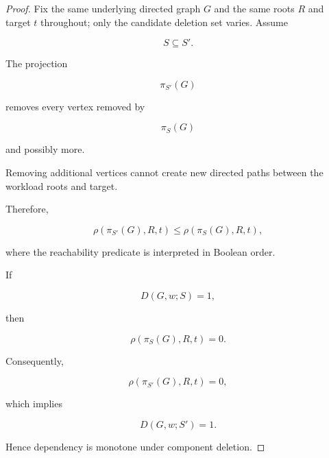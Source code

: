 \documentclass[11pt]{article}
\begin{document}
\begin{proof}

Fix the same underlying directed graph $G$ and the same roots $R$ and
target $t$ throughout; only the candidate deletion set varies. Assume

\[
S \subseteq S'.
\]

The projection

\[
\pi_{S'}(G)
\]

removes every vertex removed by

\[
\pi_S(G)
\]

and possibly more.

Removing additional vertices cannot create new directed paths between
the workload roots and target.

Therefore,

\[
\rho(\pi_{S'}(G),R,t)
\le
\rho(\pi_S(G),R,t),
\]

where the reachability predicate is interpreted in Boolean order.

If

\[
D(G,w;S)=1,
\]

then

\[
\rho(\pi_S(G),R,t)=0.
\]

Consequently,

\[
\rho(\pi_{S'}(G),R,t)=0,
\]

which implies

\[
D(G,w;S')=1.
\]

Hence dependency is monotone under component deletion.

\end{proof}
\end{document}
